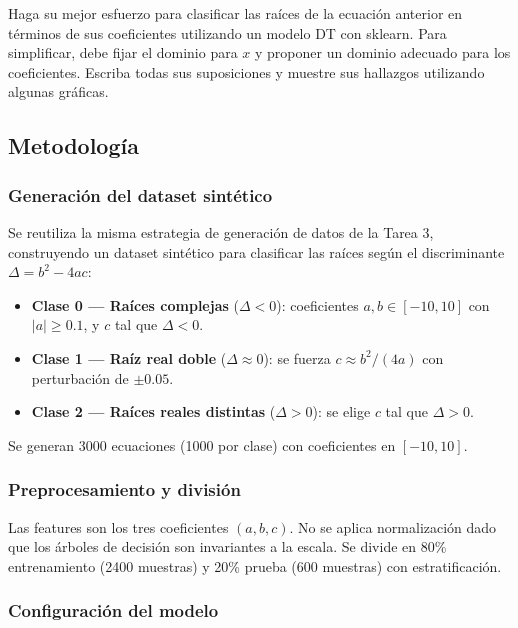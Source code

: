 \documentclass{article}
\begin{document}
Haga su mejor esfuerzo para clasificar las raíces de la ecuación anterior en términos de sus coeficientes utilizando un modelo DT con sklearn. Para simplificar, debe fijar el dominio para $x$ y proponer un dominio adecuado para los coeficientes. Escriba todas sus suposiciones y muestre sus hallazgos utilizando algunas gráficas.

\subsection{Metodología}

\subsubsection{Generación del dataset sintético}

Se reutiliza la misma estrategia de generación de datos de la Tarea 3, construyendo un dataset sintético para clasificar las raíces según el discriminante $\Delta = b^2 - 4ac$:

\begin{itemize}
    \item \textbf{Clase 0 --- Raíces complejas} ($\Delta < 0$): coeficientes $a, b \in [-10, 10]$ con $|a| \geq 0.1$, y $c$ tal que $\Delta < 0$.
    \item \textbf{Clase 1 --- Raíz real doble} ($\Delta \approx 0$): se fuerza $c \approx b^2/(4a)$ con perturbación de $\pm 0.05$.
    \item \textbf{Clase 2 --- Raíces reales distintas} ($\Delta > 0$): se elige $c$ tal que $\Delta > 0$.
\end{itemize}

Se generan 3000 ecuaciones (1000 por clase) con coeficientes en $[-10, 10]$.

\subsubsection{Preprocesamiento y división}

Las features son los tres coeficientes $(a, b, c)$. No se aplica normalización dado que los árboles de decisión son invariantes a la escala. Se divide en 80\% entrenamiento (2400 muestras) y 20\% prueba (600 muestras) con estratificación.

\subsubsection{Configuración del modelo}
\end{document}
